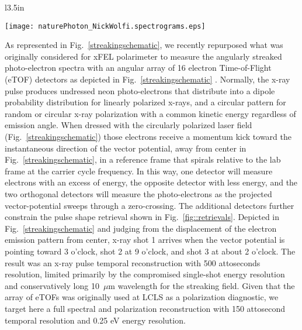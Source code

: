 \begin{wrapfigure}[22]{l}{3.5in}
\vspace{-0.5\baselineskip}
\centerline{\texttt{[image: naturePhoton\_NickWolfi.spectrograms.eps]}}
\vspace{-0.5\baselineskip}
\caption{\label{fig::retrievals}X-ray pulse shape retrievals reproduced from Ref.~\cite{Nick2018}.}
\end{wrapfigure}
As represented in Fig.~\ref{streakingschematic}, we recently repurposed what was originally considered for xFEL polarimeter \cite{Markus2014,Allaria2014,Mazza2014,Lutman2016} to measure the angularly streaked photo-electron spectra with an angular array of 16 electron Time-of-Flight (eTOF) detectors as depicted in Fig.~\ref{streakingschematic} \cite{Nick2018}.
Normally, the x-ray pulse produces undressed neon photo-electrons that distribute into a dipole probability distribution for linearly polarized x-rays, and a circular pattern for random or circular x-ray polarization with a common kinetic energy regardless of emission angle.
When dressed with the circularly polarized laser field (Fig.~\ref{streakingschematic}) those electrons receive a momentum kick toward the instantaneous direction of the vector potential, away from center in Fig.~\ref{streakingschematic}, in a reference frame that spirals relative to the lab frame at the carrier cycle frequency.
In this way, one detector will measure electrons with an excess of energy, the opposite detector with less energy, and the two orthogonal detectors will measure the photo-electrons as the projected vector-potential sweeps through a zero-crossing.
The additional detectors further constrain the pulse shape retrieval shown in Fig.~\ref{fig::retrievals}.
Depicted in Fig.~\ref{streakingschematic} and judging from the displacement of the electron emission pattern from center, x-ray shot 1 arrives when the vector potential is pointing toward 3 o'clock, shot 2 at 9 o'clock, and shot 3 at about 2 o'clock.
The result was an x-ray pulse temporal reconstruction with 500 attoseconds resolution, limited primarily by the compromised single-shot energy resolution and conservatively long 10~$\mu$m wavelength for the streaking field. 
Given that the array of eTOFs was originally used at LCLS as a polarization diagnostic, we target here a full spectral and polarization reconstruction with 150 attosecond temporal resolution and 0.25 eV energy resolution.

